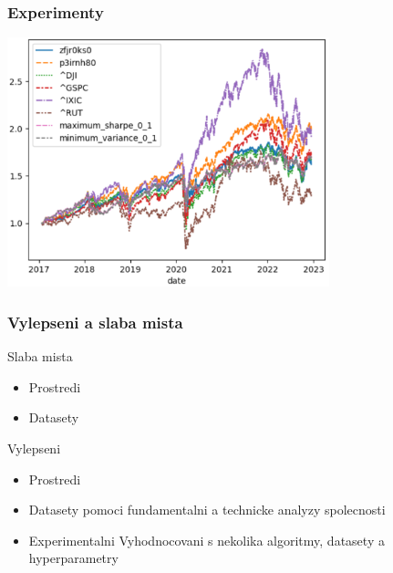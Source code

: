 \begin{frame}
    \frametitle{Experimenty}
    \begin{center}
        \centering
        \includegraphics[width=0.7\textwidth]{img/returns}
    \end{center}
\end{frame}

\begin{frame}
    \frametitle{Vylepseni a slaba mista}

    Slaba mista
    \begin{itemize}
        \item Prostredi
        \item Datasety
    \end{itemize}

    Vylepseni
    \begin{itemize}
        \item Prostredi
        \item Datasety pomoci fundamentalni a technicke analyzy spolecnosti
        \item Experimentalni Vyhodnocovani s nekolika algoritmy, datasety a hyperparametry
    \end{itemize}
\end{frame}




